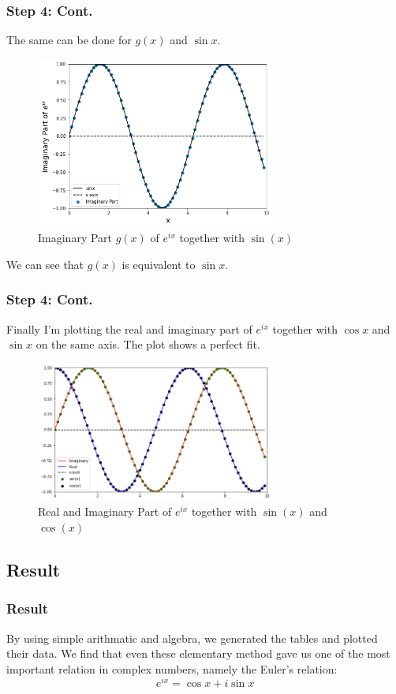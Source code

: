\documentclass{beamer}
\begin{document}
\begin{frame}
    \frametitle{Step 4: Cont.}
    The same can be done for $g(x)$ and $\sin{x}$.
    \begin{figure}
        \centering
        \includegraphics[width=0.7\textwidth, height=0.55\textheight]{img/imaginary.png}
        \caption{\label{fig:imag}Imaginary Part $g(x)$ of $e^{ix}$ together with $\sin(x)$}
    \end{figure}
    \pause
    We can see that $g(x)$ is equivalent to $\sin{x}$.
\end{frame}
\begin{frame}
    \frametitle{Step 4: Cont.}
    Finally I'm plotting the real and imaginary part of $e^{ix}$ together with $\cos{x}$ and $\sin{x}$ on the same axis. The plot shows a perfect fit.
    \begin{figure}
        \centering
        \includegraphics[width=0.7\textwidth]{img/all.png}
        \caption{\label{fig:all}Real and Imaginary Part of $e^{ix}$ together with $\sin(x)$ and $\cos(x)$}
    \end{figure}
\end{frame}

\subsection{Result}
\begin{frame}
    \frametitle{Result}
    By using simple arithmatic and algebra, we generated the tables and plotted their data. We find that even these elementary method gave us one of the most important relation in complex numbers, namely the Euler's relation:
    \begin{equation*}
        e^{ix} = \cos{x} + i\sin{x}
    \end{equation*}
\end{frame}
\end{document}
